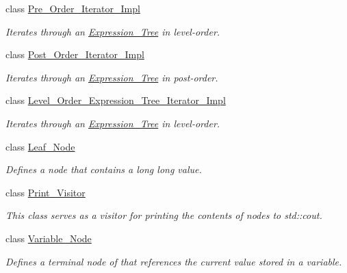 \begin{DoxyCompactItemize}
class \hyperlink{classMadara_1_1Expression__Tree_1_1Pre__Order__Iterator__Impl}{Pre\_\-Order\_\-Iterator\_\-Impl}
\begin{DoxyCompactList}\small\item\em Iterates through an {\itshape \hyperlink{classMadara_1_1Expression__Tree_1_1Expression__Tree}{Expression\_\-Tree}\/} in level-\/order. \item\end{DoxyCompactList}\item 
class \hyperlink{classMadara_1_1Expression__Tree_1_1Post__Order__Iterator__Impl}{Post\_\-Order\_\-Iterator\_\-Impl}
\begin{DoxyCompactList}\small\item\em Iterates through an {\itshape \hyperlink{classMadara_1_1Expression__Tree_1_1Expression__Tree}{Expression\_\-Tree}\/} in post-\/order. \item\end{DoxyCompactList}\item 
class \hyperlink{classMadara_1_1Expression__Tree_1_1Level__Order__Expression__Tree__Iterator__Impl}{Level\_\-Order\_\-Expression\_\-Tree\_\-Iterator\_\-Impl}
\begin{DoxyCompactList}\small\item\em Iterates through an {\itshape \hyperlink{classMadara_1_1Expression__Tree_1_1Expression__Tree}{Expression\_\-Tree}\/} in level-\/order. \item\end{DoxyCompactList}\item 
class \hyperlink{classMadara_1_1Expression__Tree_1_1Leaf__Node}{Leaf\_\-Node}
\begin{DoxyCompactList}\small\item\em Defines a node that contains a long long value. \item\end{DoxyCompactList}\item 
class \hyperlink{classMadara_1_1Expression__Tree_1_1Print__Visitor}{Print\_\-Visitor}
\begin{DoxyCompactList}\small\item\em This class serves as a visitor for printing the contents of nodes to {\itshape std::cout\/}. \item\end{DoxyCompactList}\item 
class \hyperlink{classMadara_1_1Expression__Tree_1_1Variable__Node}{Variable\_\-Node}
\begin{DoxyCompactList}\small\item\em Defines a terminal node of that references the current value stored in a variable. \item\end{DoxyCompactList}\item 

\end{DoxyCompactItemize}
